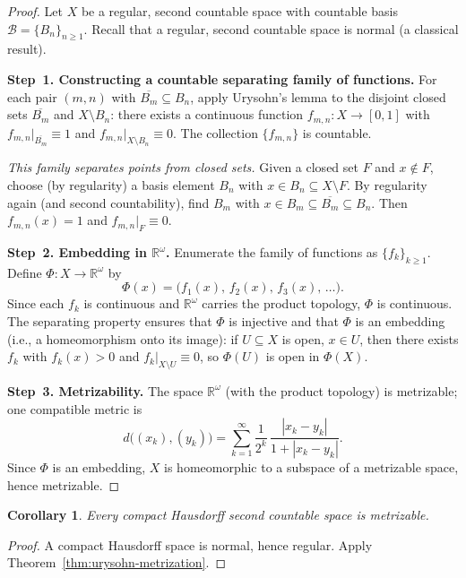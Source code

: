 \documentclass[11pt,a4paper,twoside]{book}
\newtheorem{corollary}[theorem]{Corollary}
\theoremstyle{remark}
\theoremstyle{definition}
\theoremstyle{definition}
\begin{document}
\begin{proof}
Let $X$ be a regular, second countable space with countable basis
$\mathcal{B}=\{B_n\}_{n\ge 1}$.  Recall that a regular, second
countable space is normal (a classical result).

\medskip
\textbf{Step~1.  Constructing a countable separating family of functions.}
For each pair $(m,n)$ with $\overline{B_m}\subseteq B_n$, apply
Urysohn's lemma to the disjoint closed sets $\overline{B_m}$ and
$X\setminus B_n$: there exists a continuous function
$f_{m,n}\colon X\to[0,1]$ with $f_{m,n}|_{\overline{B_m}}\equiv 1$
and $f_{m,n}|_{X\setminus B_n}\equiv 0$.  The collection
$\{f_{m,n}\}$ is countable.

\emph{This family separates points from closed sets.}  Given a closed
set $F$ and $x\notin F$, choose (by regularity) a basis element $B_n$
with $x\in B_n\subseteq X\setminus F$.  By regularity again (and
second countability), find $B_m$ with
$x\in B_m\subseteq\overline{B_m}\subseteq B_n$.  Then
$f_{m,n}(x)=1$ and $f_{m,n}|_F\equiv 0$.

\medskip
\textbf{Step~2.  Embedding in $\mathbb{R}^\omega$.}
Enumerate the family of functions as $\{f_k\}_{k\ge 1}$.  Define
$\Phi\colon X\to\mathbb{R}^\omega$ by
\[
  \Phi(x) = \bigl(f_1(x),\,f_2(x),\,f_3(x),\,\ldots\bigr).
\]
Since each $f_k$ is continuous and $\mathbb{R}^\omega$ carries the
product topology, $\Phi$ is continuous.  The separating property
ensures that $\Phi$ is injective and that $\Phi$ is an embedding
(i.e., a homeomorphism onto its image): if $U\subseteq X$ is open,
$x\in U$, then there exists $f_k$ with $f_k(x)>0$ and
$f_k|_{X\setminus U}\equiv 0$, so $\Phi(U)$ is open in
$\Phi(X)$.

\medskip
\textbf{Step~3.  Metrizability.}
The space $\mathbb{R}^\omega$ (with the product topology) is
metrizable; one compatible metric is
\[
  d\bigl((x_k),(y_k)\bigr)
  = \sum_{k=1}^{\infty}\frac{1}{2^k}\,
    \frac{|x_k - y_k|}{1+|x_k - y_k|}.
\]
Since $\Phi$ is an embedding, $X$ is homeomorphic to a subspace of a
metrizable space, hence metrizable.
\end{proof}

\begin{corollary}
\label{cor:compact-hausdorff-2nd-count-metrizable}
Every compact Hausdorff second countable space is metrizable.
\end{corollary}

\begin{proof}
A compact Hausdorff space is normal, hence regular.  Apply
Theorem~\ref{thm:urysohn-metrization}.
\end{proof}
\end{document}
